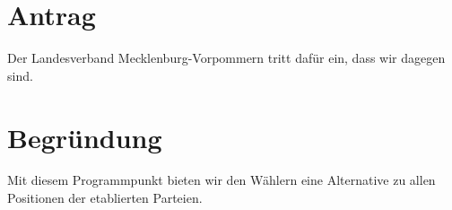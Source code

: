 \section{Antrag}

Der Landesverband Mecklenburg-Vorpommern tritt dafür ein, dass wir dagegen sind.

\section{Begründung}

Mit diesem Programmpunkt bieten wir den Wählern eine Alternative zu allen Positionen der etablierten Parteien.
